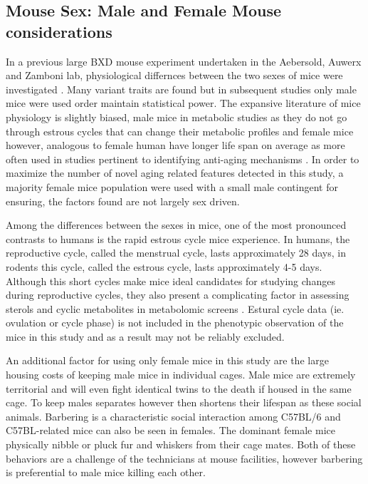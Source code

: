 \documentclass[a4paper,11pt,twoside]{book}
\begin{document}
	\subsection{Mouse Sex: Male and Female Mouse considerations}
	
	In a previous large BXD mouse experiment undertaken in the Aebersold, Auwerx and Zamboni lab, physiological differnces between the two sexes of mice were investigated \citep{Andreux2012SystemsTraits}. Many variant traits are found but in subsequent studies only male mice were used order maintain statistical power. The expansive literature of mice physiology is slightly biased, male mice in metabolic studies as they do not go through estrous cycles that can change their metabolic profiles\citep{Zucker2010MalesStudies} and female mice however, analogous to female human have longer life span on average as more often used in studies pertinent to identifying anti-aging mechanisms \citep{Yuan2011Miceaging}. In order to maximize the number of novel aging related features detected in this study, a majority female mice population were used with a small male contingent for ensuring, the factors found are not largely sex driven.
	
	Among the differences between the sexes in mice, one of the most pronounced contrasts to humans is the rapid estrous cycle mice experience. In humans, the reproductive cycle, called the menstrual cycle, lasts approximately 28 days, in rodents this cycle, called the estrous cycle, lasts approximately 4-5 days\citep{Nilsson2015MeasurementSpectrometry}. Although this short cycles make mice ideal candidates for studying changes during reproductive cycles, they also present a complicating factor in assessing sterols and cyclic metabolites in metabolomic screens \citep{Zucker2010MalesStudies}. Estural cycle data (ie. ovulation or cycle phase) is not included in the phenotypic observation of the mice in this study and as a result may not be reliably excluded. 
	
	An additional factor for using only female mice in this study are the large housing costs of keeping male mice in individual cages. Male mice are extremely territorial and will even fight identical twins to the death if housed in the same cage. To keep males separates however then shortens their lifespan as these social animals. Barbering is a characteristic social interaction among C57BL/6 and C57BL-related mice can also be seen in females\citep{Kalueff2006HairResearch}. The dominant female mice physically nibble or pluck fur and whiskers from their cage mates\citep{Kalueff2006HairResearch}. Both of these behaviors are a challenge of the technicians at mouse facilities, however barbering is preferential to male mice killing each other.
		
\end{document}

